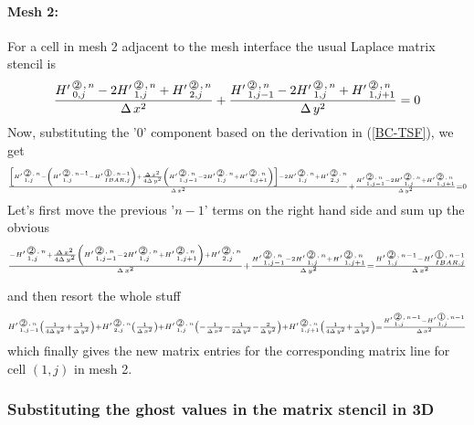 \paragraph{Mesh 2:} 

\vspace{0.5cm}
For a cell in mesh 2 adjacent to the mesh interface the usual Laplace matrix stencil is
\[   
   \frac{ \HL{0,j}{2}{n} -2 \HL{1,j}{2}{n} + \HL{2,j}{2}{n} }{\DXT} +  
   \frac{ \HL{1,j-1}{2}{n} -2 \HL{1,j}{2}{n} + \HL{1,j+1}{2}{n} }{\DYT} = 0 
\]
Now, substituting the '$0$' component based on the derivation in (\ref{BC-TSF}), we get 
\[ 
  {\scriptstyle  
   \frac{ 
   \left[
         \HL{1,j}{2}{n}  - \left( \HL{1,j}{2}{n-1} - \HL{IBAR,j}{1}{n-1}\right)
      + \frac{\DXT}{4\DYT}   \left(\HL{1,j-1}{2}{n} - 2 \HL{1,j}{2}{n} + \HL{1,j+1}{2}{n}\right)
   \right] 
   -2 \HL{1,j}{2}{n} + \HL{2,j}{2}{n} }{\DXT} +  
   \frac{ \HL{1,j-1}{2}{n} -2 \HL{1,j}{2}{n} + \HL{1,j+1}{2}{n} }{\DYT} = 0 
   }
\]
Let's first move the previous '${n-1}$' terms on the right hand side and sum up the obvious
\[ 
  {\scriptstyle  
   \frac{ 
         -\HL{1,j}{2}{n}  
      + \frac{\DXT}{4\DYT}   \left(\HL{1,j-1}{2}{n} - 2 \HL{1,j}{2}{n} + \HL{1,j+1}{2}{n}\right)
 + \HL{2,j}{2}{n} }{\DXT} +  
   \frac{ \HL{1,j-1}{2}{n} -2 \HL{1,j}{2}{n} + \HL{1,j+1}{2}{n} }{\DYT} =  \frac{\HL{1,j}{2}{n-1} - \HL{IBAR,j}{1}{n-1}}{\DXT}
   }
\]


and then resort the whole stuff
\[ {\scriptstyle 
      \HL{1,j-1}{2}{n} \left( \frac {1}{4\DYT} + \frac {1}{\DYT}    \right)
 +   \HL{2,j}{2}{n} \left( \frac {1}{\DXT} \right)
 +   \HL{1,j}{2}{n} \left( -\frac {1}{\DXT} - \frac {1}{2\DYT} - \frac {2}{\DYT}    \right)
 +    \HL{1,j+1}{2}{n} \left( \frac {1}{4\DYT}   + \frac {1}{\DYT}    \right)
    = \frac{\HL{1,j}{2}{n-1} - \HL{1,j}{1}{n-1}}{\DXT} }
\]
which finally gives the new matrix entries for the corresponding matrix line for cell $(1,j)$ in mesh 2.

\newpage

\subsubsection{Substituting the ghost values in the matrix stencil in 3D}
%
